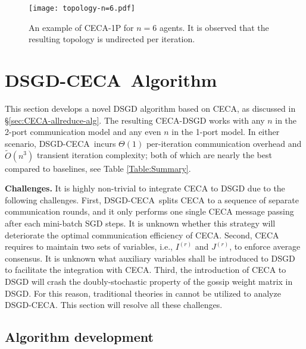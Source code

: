 \documentclass{article}
\newcommand{\Ours}{DSGD-CECA}
\theoremstyle{plain}
\theoremstyle{definition}
\begin{document}
\begin{figure}[t]
\vskip 0.2in
\begin{center}
\centerline{\texttt{[image: topology-n=6.pdf]}}
\caption{
An example of CECA-1P for $n=6$ agents. It is observed that the resulting topology is undirected per iteration. %
}
\label{fig:1p-example-n=6-1P}
\end{center}
\vskip -0.2in
\end{figure}





\section{\Ours\ Algorithm}
This section develops a novel DSGD algorithm based on CECA, as discussed in \S \ref{sec:CECA-allreduce-alg}. The resulting CECA-DSGD works with any $n$ in the 2-port communication model and any even $n$ in the 1-port model. In either scenario, \Ours\ incurs $\Theta(1)$ per-iteration communication overhead and $\tilde{O}(n^3)$ transient iteration complexity; both of which are nearly the best compared to  baselines, see Table \ref{Table:Summary}. 

\textbf{Challenges.} It is highly non-trivial to integrate CECA to DSGD due to the following  challenges. First, \Ours\ splits CECA to a sequence of separate communication rounds, and it only performs one single CECA message passing after each mini-batch SGD steps. It is unknown whether this strategy will deteriorate the optimal communication efficiency of CECA. Second, CECA requires to maintain two sets of variables, i.e., $I^{(r)}$ and $J^{(r)}$, to enforce average consensus. It is unknown what auxiliary variables shall be introduced to DSGD to facilitate the integration with CECA. Third, the introduction of CECA to DSGD will crash the doubly-stochastic property of the gossip weight matrix in DSGD. For this reason, traditional theories in  \cite{koloskova2020unified,alghunaim2021unified,ying2021exponential} cannot be utilized to analyze \Ours. This section will resolve all these challenges. 

\subsection{Algorithm development}
\end{document}
